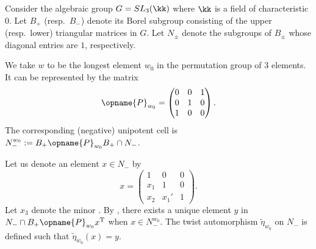 \documentclass[pdftex]{sigma}
\newcommand{\trans}{\opname{P}}
\numberwithin{equation}{section}
\begin{document}
\begin{Example}\label{eg:twist_auto_matrix}
Consider the algebraic group $G=SL_{3}(\kk)$ where $\kk$ is a field
of characteristic $0$. Let $B_{+}$ (resp.\ $B_{-}$) denote its Borel
subgroup consisting of the upper (resp.\ lower) triangular matrices
in $G$. Let $N_{\pm}$ denote the subgroups of $B_{\pm}$ whose diagonal
entries are $1$, respectively.

We take $w$ to be the longest element $w_{0}$ in the permutation
group of $3$ elements. It can be represented by the matrix{\samepage \[\trans_{w_{0}}=\begin{pmatrix}
0 & 0 & 1\\
0 & 1 & 0\\
1 & 0 & 0
\end{pmatrix}.\] The corresponding (negative) unipotent cell is $N_{-}^{w_{0}}:=B_{+}\trans_{w_{0}}B_{+}\cap N_{-}$.}

Let us denote an element $x\in N_{-}$ by \[x=\begin{pmatrix}
1 & 0 & 0\\
x_{1} & 1 & 0\\
x_{2} & x_{1}' & 1
\end{pmatrix}.\] Let $x_{3}$ denote the minor . By \cite{berenstein1997total}, there exists a unique element $y$
in $N_{-}\cap B_{+}\trans_{w_{0}}x^{\rm T}$ when $x\in N_{-}^{w_{0}}$.
The twist automorphism $\tilde{\eta}_{w_{0}}$ on $N_{-}$ is defined
such that $\tilde{\eta}_{w_{0}}(x)=y$.


\end{Example}
\end{document}
